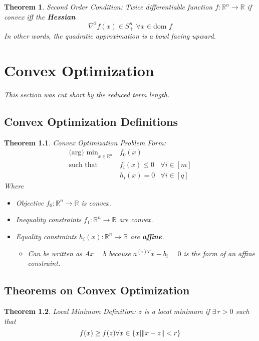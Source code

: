 \documentclass[a4paper,12pt]{report}
\DeclarePairedDelimiter\norm{\lVert}{\rVert}%
\def\reals{\mathbb{R}}
\newtheorem{theorem}{Theorem}
\begin{document}
\begin{theorem}{Second Order Condition: }
Twice differentiable function $f:\reals^n \to \reals$ if convex iff the \textbf{Hessian} 
\begin{equation}
\nabla^2 f(x) \in S_{+}^n \,\, \forall x\in \text{dom }f
\end{equation}
In other words, the quadratic approximation is a bowl facing upward. 
\end{theorem}



\chapter{Convex Optimization}

\textit{This section was cut short by the reduced term length.} 

\section{Convex Optimization Definitions}

\begin{theorem}{Convex Optimization Problem Form: }
\begin{align}
\text{(arg) min}_{x\in \reals^n} \, & f_0 (x) \\
\text{such that } & f_i(x) \leq 0 & \forall i\in [m] \\
& h_i(x) = 0 & \forall i \in [q]
\end{align} 
Where 
\begin{itemize}
\item Objective $f_0:\reals^n \to \reals$ is convex.
\item Inequality constraints $f_1:\reals^n \to \reals$ are convex.
\item Equality constraints $h_i(x):\reals^n\to \reals$ are \textbf{affine}.
\begin{itemize}
\item Can be written as $Ax = b$ because $a^{(i)T} x - b_i = 0$ is the form of an affine constraint.
\end{itemize}
\end{itemize}
\end{theorem}

\section{Theorems on Convex Optimization}

\begin{theorem}{Local Minimum Definition: }
$z$ is a local minimum if $\exists \, r > 0$ such that 
\begin{equation}
f(x) \geq f(z) \forall x \in \{x | \norm{x-z} < r\}
\end{equation}
\end{theorem}
\end{document}
